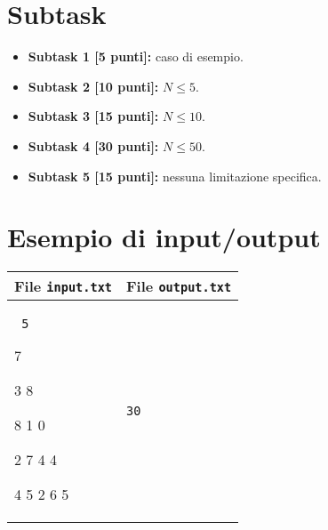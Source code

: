 \documentclass[a4paper,11pt]{article}
\newcommand{\file}[1]{\texttt{#1}}
\newcommand{\esempio}[2]{
\noindent\begin{minipage}{\textwidth}
\begin{tabular}{|p{11cm}|p{5cm}|}
	\hline
	\textbf{File \file{input.txt}} & \textbf{File \file{output.txt}}\\
	\hline
	\tt \small #1 &
	\tt \small #2 \\
	\hline
\end{tabular}
\end{minipage}
}
\begin{document}
\section*{Subtask}
\begin{itemize}
\item \textbf{Subtask 1 [\phantom{1}5 punti]:} caso di esempio.
\item \textbf{Subtask 2 [10 punti]:} $N \le 5$.
\item \textbf{Subtask 3 [15 punti]:} $N \le 10$.
\item \textbf{Subtask 4 [30 punti]:} $N \le 50$.
\item \textbf{Subtask 5 [15 punti]:} nessuna limitazione specifica.
\end{itemize}

\section*{Esempio di input/output}
\esempio{
5

7

3 8

8 1 0

2 7 4 4

4 5 2 6 5
}{30}
\end{document}
